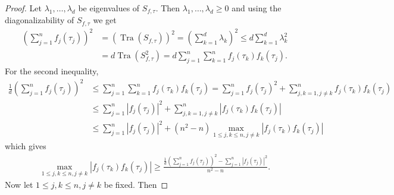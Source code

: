 \documentclass{amsart}
\begin{document}
  \begin{proof}
  	Let $\lambda_1, \dots, \lambda_d$ be eigenvalues of $	S_{f, \tau}$. Then $\lambda_1, \dots, \lambda_d\geq0$ and using the diagonalizability of $	S_{f, \tau}$  we get 
  	\begin{align}\label{INTERMEDIATE}
  \left(\sum_{j=1}^n
  f_j(\tau_j)\right)^2&=	(\operatorname{Tra}(S_{f,\tau}))^2=\left(\sum_{k=1}^d
  \lambda_k\right)^2\leq d \sum_{k=1}^d
  \lambda_k^2 \nonumber\\
  &=d\operatorname{Tra}(S^2_{f,\tau})=d\sum_{j=1}^n\sum_{k=1}^nf_j(\tau_k)f_k(\tau_j).
  	\end{align}
 For the second inequality,  
   \begin{align*}
  \frac{1}{d} \left(\sum_{j=1}^n
  f_j(\tau_j)\right)^2&\leq \sum_{j=1}^n\sum_{k=1}^nf_j(\tau_k)f_k(\tau_j)=\sum_{j=1}^nf_j(\tau_j)^2+\sum_{j,k=1, j\neq k}^nf_j(\tau_k)f_k(\tau_j)\\
  &\leq \sum_{j=1}^n|f_j(\tau_j)|^2+\sum_{j,k=1, j\neq k}^n|f_j(\tau_k)f_k(\tau_j)|\\
  &\leq \sum_{j=1}^n|f_j(\tau_j)|^2+ (n^2-n)\max _{1\leq j,k \leq n, j\neq k}|f_j(\tau_k)f_k(\tau_j)|
  \end{align*}	
  which gives 
  \begin{align}\label{PROOFFIRST}
  \max _{1\leq j,k \leq n, j\neq k}|f_j(\tau_k)f_k(\tau_j)|\geq \frac{\frac{1}{d}	\left(\sum_{j=1}^n
  	f_j(\tau_j)\right)^2-	\sum_{j=1}^n
  	|f_j(\tau_j)|^2}{n^2-n}.
  \end{align}
  Now let $1\leq j,k \leq n, j\neq k$ be fixed. Then 
  

\end{proof}
\end{document}
